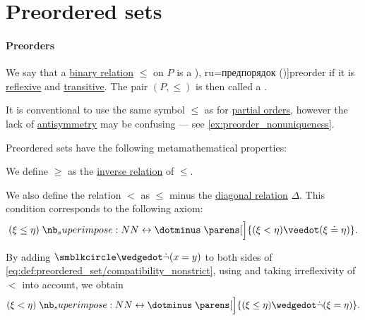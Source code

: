\section{Preordered sets}\label{sec:preordered_sets}

\paragraph{Preorders}

\begin{definition}\label{def:preordered_set}
  We say that a \hyperref[def:binary_relation]{binary relation} \( \leq \) on \( P \) is a \term[bg=преднаредба (\cite[9]{Проданов1982ФункционаленАнализЧаст1}), ru=предпорядок (\cite[def 3.1]{Гуров2013ТеорияРешёток})]{preorder} if it is \hyperref[def:binary_relation/reflexive]{reflexive} and \hyperref[def:binary_relation/transitive]{transitive}. The pair \( (P, \leq) \) is then called a .

  It is conventional to use the same symbol \( \leq \) as for \hyperref[def:partially_ordered_set]{partial orders}, however the lack of \hyperref[def:binary_relation/antisymmetric]{antisymmetry} may be confusing --- see \cref{ex:preorder_nonuniqueness}.

  Preordered sets have the following metamathematical properties:
  \begin{thmenum}[series=def:preordered_set]
     We define \( \geq \) as the \hyperref[def:binary_relation/converse]{inverse relation} of \( \leq \).

     We also define the relation \( < \) as \( \leq \) minus the \hyperref[def:binary_relation/diagonal]{diagonal relation} \( \Delta \). This condition corresponds to the following axiom:
    \begin{equation}\label{eq:def:preordered_set/compatibility_nonstrict}
      (\xi \leq \eta) \syniff \parens[\Big]{(\xi < \eta) \synvee (\xi \syneq \eta)}.
    \end{equation}

    By adding \( \anon \synwedge \synneg (x = y) \) to both sides of \eqref{eq:def:preordered_set/compatibility_nonstrict}, using  and taking irreflexivity of \( < \) into account, we obtain
    \begin{equation}\label{eq:def:preordered_set/compatibility_strict}
      (\xi < \eta) \syniff \parens[\Big]{(\xi \leq \eta) \synwedge \synneg (\xi = \eta)}.
    \end{equation}


\end{thmenum}
\end{definition}
